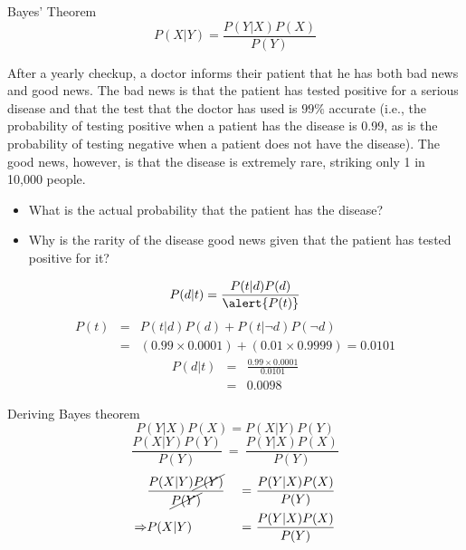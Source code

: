 \documentclass[xcolor={table}]{beamer}
\begin{document}
 \begin{frame} 
\begin{alertblock}{Bayes' Theorem}
\begin{equation*}
P(X|Y)=\frac{P(Y|X)P(X)}{P(Y)}
\end{equation*}
\end{alertblock}
\end{frame} 


\begin{frame}
	\begin{example}
	After a yearly checkup, a doctor informs their patient that he has both bad news and good news. The bad news is that the patient has tested positive for a serious disease and that the test that the doctor has used is $99\%$ accurate (i.e., the probability of testing positive when a patient has the disease is 0.99, as is the probability of testing negative when a patient does not have the disease). The good news, however, is that the disease is extremely rare, striking only 1 in 10,000 people. 
	\end{example}
	\begin{itemize}
		\item  What is the actual probability that the patient has the disease? 
		\item Why is the rarity of the disease good news given that the patient has tested positive for it?
	\end{itemize}
\end{frame}

 \begin{frame}
 \begin{equation*}
P(d|t)=\frac{P(t|d)P(d)}{\alert{P(t)}}
\end{equation*}
\begin{eqnarray*}
P(t) & = & P(t|d)P(d)+P(t|\lnot d)P(\lnot d) \\
& = & (0.99 \times 0.0001)+(0.01 \times 0.9999) = 0.0101
\end{eqnarray*}
\begin{eqnarray*}
P(d|t)& = &\displaystyle\frac{0.99 \times 0.0001}{0.0101} \\
& = & 0.0098
\end{eqnarray*}
\end{frame} 

 \begin{frame} 
 Deriving Bayes theorem
\begin{equation*}
P(Y|X)P(X)=P(X|Y)P(Y)
\end{equation*}
\begin{equation*}
\frac{P(X|Y)P(Y)}{P(Y)}~=~\frac{P(Y|X)P(X)}{P(Y)}
\end{equation*}
\begin{alignat*}{4}
& \frac{P(X|Y)\cancel{P(Y)}}{\cancel{P(Y)}}&~=~&\frac{P(Y|X)P(X)}{P(Y)}\\
\Rightarrow & P(X|Y)&~=~&\frac{P(Y|X)P(X)}{P(Y)}
\end{alignat*}
\end{frame} 
\end{document}
